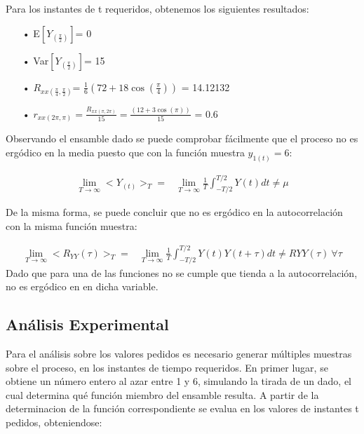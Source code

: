 Para los instantes de t requeridos, obtenemos los siguientes resultados:
\begin{enumerate}
	\item[•]E$\left[ Y_{(\frac{\pi}{2})}\right]$= 0 
	\item[•]Var$\left[Y_{(\frac{\pi}{2})}\right]$= 15
	\item[•]$R_{xx(\frac{\pi}{4},\frac{\pi}{2})}$= $\frac{1}{6} (72 + 18 \cos(\frac{\pi}{4}))$ = 14.12132
	\item[•]$r_{xx(2\pi,\pi)} = \frac{R_{xx(\pi,2\pi)}}{15} = \frac{ (12 + 3 \cos(\pi))}{15}$ = 0.6 \\
\end{enumerate}

Observando el ensamble dado se puede comprobar fácilmente que el proceso no es ergódico en la media puesto que con la función muestra $y_{1(t)} = 6$:

\begin{equation*}
\begin{split}
	\lim_{T\to\infty} < Y_{(t)} >_T = & \lim_{T\to\infty} \frac{1}{T} \int_{-T/2}^{T/2} Y(t) dt  \neq \mu 
\end{split}
\end{equation*}

De la misma forma, se puede concluir que no es ergódico en la autocorrelación con la misma función muestra:

\begin{equation*}
\begin{split}
	\lim_{T\to\infty} < R_{YY}(\tau) >_T = & \lim_{T\to\infty} \frac{1}{T} \int_{-T/2}^{T/2} Y(t) Y(t + \tau) dt \neq R{YY}(\tau) \ 	\forall \tau
\end{split}	
\end{equation*}
Dado que para una de las funciones no se cumple que tienda a la autocorrelación, no es ergódico en en dicha variable.\\


\subsection{Análisis Experimental}

Para el análisis sobre los valores pedidos es necesario generar múltiples muestras sobre el proceso, en los instantes de tiempo requeridos. En primer lugar, se obtiene un número entero al azar entre 1 y 6, simulando la tirada de un dado, el cual determina qué función miembro del ensamble resulta.
A partir de la determinacion de la función correspondiente se evalua en los valores de instantes t pedidos, obteniendose:

